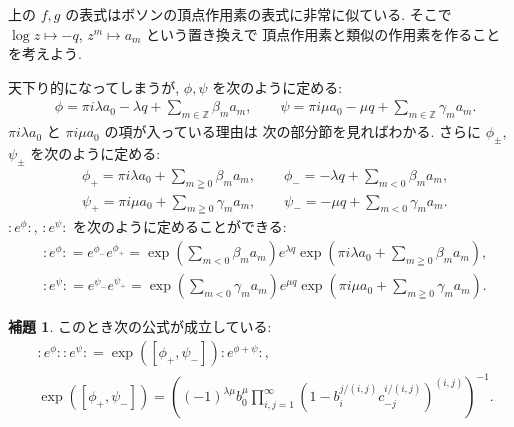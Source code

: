 \documentclass[12pt,twoside]{jarticle}
\newcommand\Z{{\mathbb Z}} %
\theoremstyle{definition} %
\newtheorem*{lemma*}{補題}
\theoremstyle{definition} %
\theoremstyle{definition} %
\numberwithin{theorem}{section}
\numberwithin{equation}{section}
\numberwithin{figure}{section}
\numberwithin{table}{section}
\newcommand\np[1]{{:}{#1}{:}}
\begin{document}
上の $f,g$ の表式はボソンの頂点作用素の表式に非常に似ている.
そこで $\log z\mapsto -q$, $z^m\mapsto a_m$ という置き換えで
頂点作用素と類似の作用素を作ることを考えよう.

天下り的になってしまうが, $\phi,\psi$ を次のように定める:
\begin{align*}
&
\phi = \pi i\lambda a_0 - \lambda q + \sum_{m\in\Z}\beta_m  a_m,
\qquad
\psi = \pi i\mu     a_0 - \mu     q + \sum_{m\in\Z}\gamma_m a_m.
\end{align*}
$\pi i\lambda a_0$ と $\pi i\mu a_0$ の項が入っている理由は
次の部分節を見ればわかる.
さらに $\phi_\pm$, $\psi_\pm$ を次のように定める:
\begin{align*}
&
\phi_+ = \pi i\lambda a_0 + \sum_{m\geqq0}\beta_m  a_m, \qquad
\phi_- = -\lambda q + \sum_{m<0}\beta_m a_m, 
\\ &
\psi_+ = \pi i\mu     a_0 + \sum_{m\geqq0}\gamma_m a_m, \qquad
\psi_- = -\mu q     + \sum_{m<0}\gamma_m a_m.
\end{align*}
$\np{e^\phi}$, $\np{e^\psi}$ を次のように定めることができる:
\begin{align*}
&
\np{e^\phi}=e^{\phi_-}e^{\phi_+}=
\exp\left(\sum_{m<0} \beta_m a_m \right) 
e^{\lambda q}
\exp\left(\pi i\lambda a_0+\sum_{m\geqq 0} \beta_m a_m \right),
\\ &
\np{e^\psi}=e^{\psi_-}e^{\psi_+}=
\exp\left(\sum_{m<0} \gamma_m a_m \right) 
e^{\mu q}
\exp\left(\pi i \mu a_0 + \sum_{m\geqq 0} \gamma_m a_m \right).
\end{align*}

\begin{lemma*}
このとき次の公式が成立している:
\begin{align*}
&
\np{e^\phi}\np{e^\psi} = \exp([\phi_+,\psi_-])\np{e^{\phi+\psi}},
\\ &
\exp([\phi_+,\psi_-])=
\left(
(-1)^{\lambda\mu}b_0^\mu \prod_{i,j=1}^\infty\left(1-b_i^{j/(i,j)}c_{-j}^{i/(i,j)}\right)^{(i,j)}
\right)^{-1}.
\end{align*}
\end{lemma*}
\end{document}
